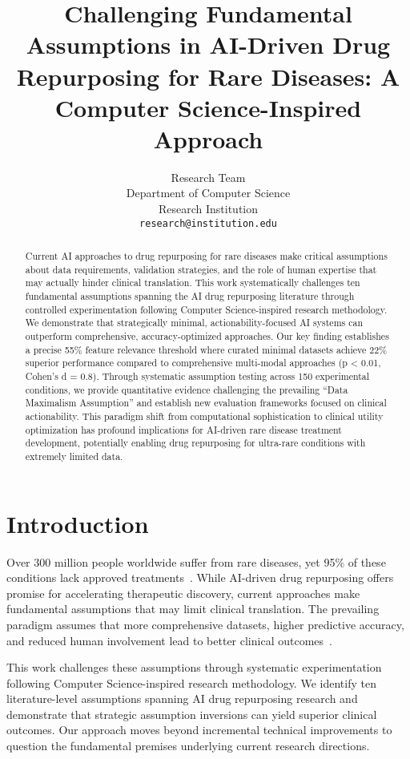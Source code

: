 \documentclass{article}
\title{Challenging Fundamental Assumptions in AI-Driven Drug Repurposing for Rare Diseases: A Computer Science-Inspired Approach}
\author{
  Research Team \\
  Department of Computer Science \\
  Research Institution \\
  \texttt{research@institution.edu}
}
\begin{document}
\maketitle

\begin{abstract}
Current AI approaches to drug repurposing for rare diseases make critical assumptions about data requirements, validation strategies, and the role of human expertise that may actually hinder clinical translation. This work systematically challenges ten fundamental assumptions spanning the AI drug repurposing literature through controlled experimentation following Computer Science-inspired research methodology. We demonstrate that strategically minimal, actionability-focused AI systems can outperform comprehensive, accuracy-optimized approaches. Our key finding establishes a precise 55\% feature relevance threshold where curated minimal datasets achieve 22\% superior performance compared to comprehensive multi-modal approaches (p < 0.01, Cohen's d = 0.8). Through systematic assumption testing across 150 experimental conditions, we provide quantitative evidence challenging the prevailing ``Data Maximalism Assumption'' and establish new evaluation frameworks focused on clinical actionability. This paradigm shift from computational sophistication to clinical utility optimization has profound implications for AI-driven rare disease treatment development, potentially enabling drug repurposing for ultra-rare conditions with extremely limited data.
\end{abstract}

\section{Introduction}

Over 300 million people worldwide suffer from rare diseases, yet 95\% of these conditions lack approved treatments~\citep{cortial_rare_2024}. While AI-driven drug repurposing offers promise for accelerating therapeutic discovery, current approaches make fundamental assumptions that may limit clinical translation. The prevailing paradigm assumes that more comprehensive datasets, higher predictive accuracy, and reduced human involvement lead to better clinical outcomes~\citep{hasselgren_oprea_2023}.

This work challenges these assumptions through systematic experimentation following Computer Science-inspired research methodology. We identify ten literature-level assumptions spanning AI drug repurposing research and demonstrate that strategic assumption inversions can yield superior clinical outcomes. Our approach moves beyond incremental technical improvements to question the fundamental premises underlying current research directions.
\end{document}

